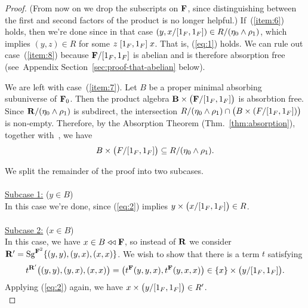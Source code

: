 \begin{proof}
(From now on we drop the subscripts on $\mathbf{F}$, since distinguishing between the
first and second factors of the product is no longer helpful.)
If~(\ref{item:6}) holds, then we're done since in that case
$(y, x/[1_{F},1_{F}]) \in R/(\eta_0 \wedge \rho_1)$,
which implies $(y, z) \in R$ for some $z \mathrel{[1_{F}, 1_{F}]} x$.
That is, (\ref{eq:1}) holds.
We can rule out case~(\ref{item:8}) because $\mathbf{F}/[1_{F}, 1_{F}]$ is abelian and
is therefore absorption free
(see~Appendix Section~\ref{sec:proof-that-abelian} below).


We are left with case~(\ref{item:7}).
Let $B$ be a proper minimal absorbing subuniverse of $\mathbf{F}_0$.
Then the product algebra $\mathbf{B}\times \bigl(\mathbf{F}/[1_{F}, 1_{F}]\bigr)$ is
absorbtion free.
Since $\mathbf{R}/(\eta_0 \wedge \rho_1)$ is subdirect, the intersection
$R/(\eta_0 \wedge \rho_1) \cap \bigl(B \times (F/[1_{F}, 1_{F}])\bigr)$ is
non-empty. Therefore, by the Absorption Theorem (Thm.~\ref{thm:absorption}),
together with~\cite[Lemmas~4.7, 4.9, 4.11, 4.12]{Bergman-DeMeo-2016},
we have
\begin{equation}
  \label{eq:2}
B \times \bigl(F/[1_{F}, 1_{F}]\bigr) \subseteq R/(\eta_0 \wedge \rho_1).
\end{equation}

We split the remainder of the proof into two subcases.\\
\\
\noindent \underline{Subcase 1:} ($y\in B$)\\[5pt]
In this case we're done, since (\ref{eq:2}) implies
${y} \times \bigl(x/[1_{F}, 1_{F}]\bigr) \in R$.\\
\\
\noindent \underline{Subcase 2:} ($x\in B$)\\[5pt]
In this case, we have $x \in B \mathrel{\triangleleft\triangleleft} \mathbf{F}$, so instead of $\mathbf{R}$ we
consider $\mathbf{R}' = \operatorname{Sg}^{\mathbf{F}^2}\{(y,y), (y,x), (x,x)\}$. We wish to show that there
is a term $t$ satisfying
\[
t^{\mathbf{R}'}\bigl((y,y), (y,x), (x,x)\bigr) =
\bigl(t^{\mathbf{F}}(y,y,x), t^{\mathbf{F}}(y,x,x)\bigr) \in \{x\} \times \bigl(y/[1_F, 1_F]\bigr).
\]
Applying (\ref{eq:2}) again, we have
${x} \times \bigl(y/[1_{F}, 1_{F}]\bigr) \in R'$.\\


\end{proof}
